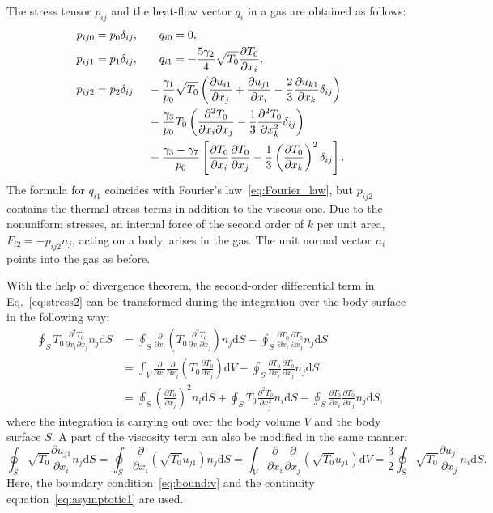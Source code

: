 \documentclass[smallextended]{svjour3} %
\newcommand{\dd}{\mathrm{d}}
\newcommand{\pder}[2][]{\frac{\partial#1}{\partial#2}}
\newcommand{\pderdual}[2][]{\frac{\partial^2#1}{\partial#2^2}}
\newcommand{\pderder}[3][]{\frac{\partial^2#1}{\partial#2\partial#3}}
\begin{document}
The stress tensor \(p_{ij}\) and the heat-flow vector \(q_i\) in a gas are obtained as follows:
\begin{alignat}{2}
    p_{ij0} &= p_0\delta_{ij}, && \quad q_{i0} = 0, \label{eq:stress0}\\
    p_{ij1} &= p_1\delta_{ij}, && \quad q_{i1} = -\frac{5\gamma_2}4\sqrt{T_0}\pder[T_0]{x_i}, \label{eq:stress1}\\
    p_{ij2} &= p_2\delta_{ij}
                &&- \frac{\gamma_1}{p_0}\sqrt{T_0}\left(
                \pder[u_{i1}]{x_j} + \pder[u_{j1}]{x_i} - \frac23\pder[u_{k1}]{x_k}\delta_{ij}
            \right) \notag\\
        & &&+ \frac{\gamma_3}{p_0} T_0\left(
                \pderder[T_0]{x_i}{x_j} - \frac13\pderdual[T_0]{x_k}\delta_{ij}
            \right) \notag\\
        & &&+ \frac{\gamma_3 - \gamma_7}{p_0}\left[
                \pder[T_0]{x_i}\pder[T_0]{x_j} - \frac13\left(\pder[T_0]{x_k}\right)^2\delta_{ij}
            \right]. \label{eq:stress2}
\end{alignat}
The formula for \(q_{i1}\) coincides with Fourier's law~\eqref{eq:Fourier_law},
but \(p_{ij2}\) contains the thermal-stress terms in addition to the viscous one.
Due to the nonuniform stresses, an internal force of the second order of \(k\) per unit area,
\(F_{i2} = -p_{ij2}n_j\), acting on a body, arises in the gas.
The unit normal vector \(n_i\) points into the gas as before.

With the help of divergence theorem, the second-order differential term in Eq.~\eqref{eq:stress2}
can be transformed during the integration over the body surface in the following way:
\begin{align*}
    \oint_S T_0\pderder[T_0]{x_i}{x_j} n_j\dd{S}
        &= \oint_S \pder{x_i} \left( T_0\pderder[T_0]{x_i}{x_j} \right) n_j\dd{S}
        - \oint_S \pder[T_0]{x_i}\pder[T_0]{x_j} n_j\dd{S} \\
        &= \int_V \pder{x_i}\pder{x_j} \left( T_0 \pder[T_0]{x_j} \right) \dd{V}
        - \oint_S \pder[T_0]{x_i}\pder[T_0]{x_j} n_j\dd{S} \\
        &= \oint_S \left(\pder[T_0]{x_j}\right)^2 n_i\dd{S}
        + \oint_S T_0\pderdual[T_0]{x_j} n_i\dd{S}
        - \oint_S \pder[T_0]{x_i}\pder[T_0]{x_j} n_j\dd{S},
\end{align*}
where the integration is carrying out over the body volume \(V\) and the body surface \(S\).
A part of the viscosity term can also be modified in the same manner:
\begin{equation*}
    \oint_S \sqrt{T_0}\pder[u_{j1}]{x_i} n_j\dd{S}
        = \oint_S \pder{x_i} \left( \sqrt{T_0} u_{j1} \right) n_j\dd{S}
        = \int_V \pder{x_i}\pder{x_j} \left( \sqrt{T_0} u_{j1} \right) \dd{V}
        = \frac{3}{2}\oint_S \sqrt{T_0} \pder[u_{j1}]{x_j} n_i\dd{S}.
\end{equation*}
Here, the boundary condition~\eqref{eq:bound:v} and the continuity equation~\eqref{eq:asymptotic1} are used.
\end{document}
